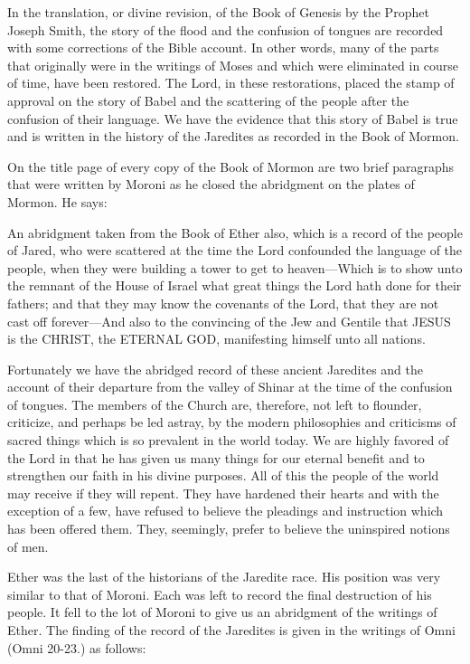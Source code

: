 In the translation, or divine revision, of the Book of Genesis by the Prophet Joseph Smith, the
story of the flood and the confusion of tongues are recorded with some corrections of the
Bible account. In other words, many of the parts that originally were in the writings of Moses
and which were eliminated in course of time, have been restored. The Lord, in these
restorations, placed the stamp of approval on the story of Babel and the scattering of the
people after the confusion of their language. We have the evidence that this story of Babel is
true and is written in the history of the Jaredites as recorded in the Book of Mormon.

On the title page of every copy of the Book of Mormon are two brief paragraphs that were
written by Moroni as he closed the abridgment on the plates of Mormon. He says:

An abridgment taken from the Book of Ether also, which is a record of the people of Jared,
who were scattered at the time the Lord confounded the language of the people, when they
were building a tower to get to heaven—Which is to show unto the remnant of the House of
Israel what great things the Lord hath done for their fathers; and that they may know the
covenants of the Lord, that they are not cast off forever—And also to the convincing of the
Jew and Gentile that JESUS is the CHRIST, the ETERNAL GOD, manifesting himself unto
all nations.

Fortunately we have the abridged record of these ancient Jaredites and the account of their
departure from the valley of Shinar at the time of the confusion of tongues. The members of
the Church are, therefore, not left to flounder, criticize, and perhaps be led astray, by the
modern philosophies and criticisms of sacred things which is so prevalent in the world today.
We are highly favored of the Lord in that he has given us many things for our eternal benefit
and to strengthen our faith in his divine purposes. All of this the people of the world may
receive if they will repent. They have hardened their hearts and with the exception of a few,
have refused to believe the pleadings and instruction which has been offered them. They,
seemingly, prefer to believe the uninspired notions of men.

Ether was the last of the historians of the Jaredite race. His position was very similar to that
of Moroni. Each was left to record the final destruction of his people. It fell to the lot of
Moroni to give us an abridgment of the writings of Ether. The finding of the record of the
Jaredites is given in the writings of Omni (Omni 20-23.) as follows:

